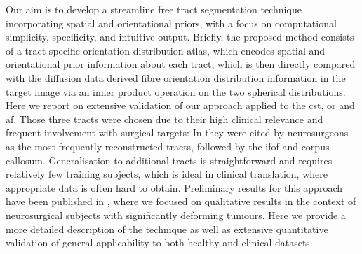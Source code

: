 Our aim is to develop a streamline free tract segmentation technique incorporating spatial and orientational priors, with a focus on computational simplicity, specificity, and intuitive output.
Briefly, the proposed method consists of a tract-specific orientation distribution atlas, which encodes spatial and orientational prior information about each tract, which is then directly compared with the diffusion data derived fibre orientation distribution information in the target image via an inner product operation on the two spherical distributions.
Here we report on extensive validation of our approach applied to the \gls{cst}, \gls{or} and \gls{af}.
Those three tracts were chosen due to their high clinical relevance and frequent involvement with surgical targets: In \textcite{Toescu2020} they were cited by neurosurgeons as the most frequently reconstructed tracts, followed by the \gls{ifof} and corpus callosum.
Generalisation to additional tracts is straightforward and requires relatively few training subjects, which is ideal in clinical translation, where appropriate data is often hard to obtain.
Preliminary results for this approach have been published in \textcite{Young2022}, where we focused on qualitative results in the context of neurosurgical subjects with significantly deforming tumours.
Here we provide a more detailed description of the technique as well as extensive quantitative validation of general applicability to both healthy and clinical datasets.

